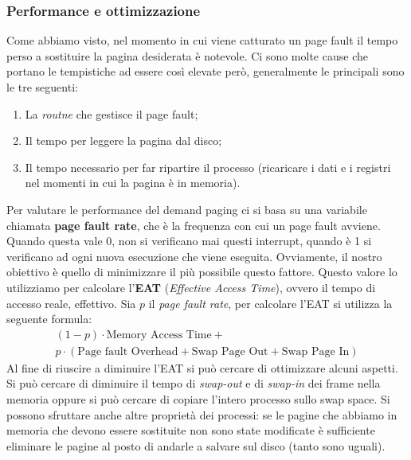 \subsubsection{Performance e ottimizzazione}
Come abbiamo visto, nel momento in cui viene catturato un page fault il tempo perso a sostituire la pagina desiderata è notevole. Ci sono molte cause che portano le tempistiche ad essere così elevate però, generalmente le principali sono le tre seguenti:
\vspace{-5px}
\begin{enumerate}
\setlength{\itemsep}{-.25 em}
    \item La \textit{routne} che gestisce il page fault;
    \item Il tempo per leggere la pagina dal disco;
    \item Il tempo necessario per far ripartire il processo (ricaricare i dati e i registri nel momenti in cui la pagina è in memoria).
\end{enumerate}
Per valutare le performance del demand paging ci si basa su una variabile chiamata \textbf{page fault rate}, che è la frequenza con cui un page fault avviene. Quando questa vale 0, non si verificano mai questi interrupt, quando è 1 si verificano ad ogni nuova esecuzione che viene eseguita. Ovviamente, il nostro obiettivo è quello di minimizzare il più possibile questo fattore. Questo valore lo utilizziamo per calcolare l'\textbf{EAT} (\textit{Effective Access Time}), ovvero il tempo di accesso reale, effettivo. Sia $p$ il \textit{page fault rate}, per calcolare l'EAT si utilizza la seguente formula:
\begin{gather*}
    (1-p)\cdot\text{Memory Access Time} + \\  p\cdot(\text{Page fault Overhead} + \text{Swap Page Out} + \text{Swap Page In})
\end{gather*}
Al fine di riuscire a diminuire l'EAT si può cercare di ottimizzare alcuni aspetti. Si può cercare di diminuire il tempo di \textit{swap-out} e di \textit{swap-in} dei frame nella memoria oppure si può cercare di copiare l'intero processo sullo swap space. Si possono sfruttare anche altre proprietà dei processi: se le pagine che abbiamo in memoria che devono essere sostituite non sono state modificate è sufficiente eliminare le pagine al posto di andarle a salvare sul disco (tanto sono uguali). 

